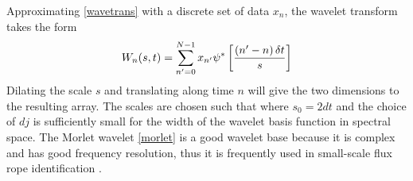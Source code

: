 \noindent Approximating \eqref{wavetrans} with a discrete set of data $x_n$, the wavelet transform takes the form %
\begin{equation}
    W_n(s,t) = \sum_{n'=0}^{N-1}x_{n'}\psi^*\left[ \frac{\left( n'-n \right)\delta t}{s} \right]
    \label{eq:wavetrans2}
\end{equation}
Dilating the scale $s$ and translating along time $n$ will give the two dimensions to the resulting array. The scales are chosen such that
where $s_0 = 2dt$ and the choice of $dj$ is sufficiently small for the width of the wavelet basis function in spectral space. The Morlet wavelet \eqref{morlet} is a good wavelet base because it is complex and has good frequency resolution, thus it is frequently used in small-scale flux rope identification \citep{Telloni:2012, Telloni:2013, Zhao:2020}.




